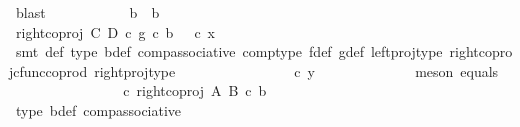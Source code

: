 \begin{isabellebody}
\ blast\isanewline
\ \ \ \ \ \ \ \ \isamarkupfalse%
\ \isamarkupfalse%
\ {\isachardoublequoteopen}b\ {\isacharequal}{\kern0pt}\ b{\isacharprime}{\kern0pt}{\isachardoublequoteclose}\isanewline
\ \ \ \ \ \ \ \ \isamarkupfalse%
\ {\isacharminus}{\kern0pt}\ \isanewline
\ \ \ \ \ \ \ \ \ \ \isamarkupfalse%
\ {\isachardoublequoteopen}{\isacharparenleft}{\kern0pt}right{\isacharunderscore}{\kern0pt}coproj\ C\ D\ {\isasymcirc}\isactrlsub c\ g{\isacharparenright}{\kern0pt}\ {\isasymcirc}\isactrlsub c\ b\ {\isacharequal}{\kern0pt}\ {\isasymphi}\ {\isasymcirc}\isactrlsub c\ x{\isachardoublequoteclose}\isanewline
\ \ \ \ \ \ \ \ \ \ \ \ \isamarkupfalse%
\ {\isacharparenleft}{\kern0pt}smt\ {\isasymphi}{\isacharunderscore}{\kern0pt}def\ {\isasymphi}{\isacharunderscore}{\kern0pt}type\ b{\isacharunderscore}{\kern0pt}def\ comp{\isacharunderscore}{\kern0pt}associative{}\ comp{\isacharunderscore}{\kern0pt}type\ f{\isacharunderscore}{\kern0pt}def{\isacharparenleft}{\kern0pt}{}{\isacharparenright}{\kern0pt}\ g{\isacharunderscore}{\kern0pt}def{\isacharparenleft}{\kern0pt}{}{\isacharparenright}{\kern0pt}\ left{\isacharunderscore}{\kern0pt}proj{\isacharunderscore}{\kern0pt}type\ right{\isacharunderscore}{\kern0pt}coproj{\isacharunderscore}{\kern0pt}cfunc{\isacharunderscore}{\kern0pt}coprod\ right{\isacharunderscore}{\kern0pt}proj{\isacharunderscore}{\kern0pt}type{\isacharparenright}{\kern0pt}\isanewline
\ \ \ \ \ \ \ \ \ \ \isamarkupfalse%
\ \isamarkupfalse%
\ {\isachardoublequoteopen}{\isachardot}{\kern0pt}{\isachardot}{\kern0pt}{\isachardot}{\kern0pt}\ {\isacharequal}{\kern0pt}\ {\isasymphi}\ {\isasymcirc}\isactrlsub c\ y{\isachardoublequoteclose}\isanewline
\ \ \ \ \ \ \ \ \ \ \ \ \isamarkupfalse%
\ {\isacharparenleft}{\kern0pt}meson\ equals{\isacharparenright}{\kern0pt}\isanewline
\ \ \ \ \ \ \ \ \ \ \isamarkupfalse%
\ \isamarkupfalse%
\ {\isachardoublequoteopen}{\isachardot}{\kern0pt}{\isachardot}{\kern0pt}{\isachardot}{\kern0pt}\ {\isacharequal}{\kern0pt}\ {\isacharparenleft}{\kern0pt}{\isasymphi}\ {\isasymcirc}\isactrlsub c\ right{\isacharunderscore}{\kern0pt}coproj\ A\ B{\isacharparenright}{\kern0pt}\ {\isasymcirc}\isactrlsub c\ b{\isacharprime}{\kern0pt}{\isachardoublequoteclose}\isanewline
\ \ \ \ \ \ \ \ \ \ \ \ \isamarkupfalse%
\ {\isasymphi}{\isacharunderscore}{\kern0pt}type\ b{\isacharprime}{\kern0pt}{\isacharunderscore}{\kern0pt}def\ comp{\isacharunderscore}{\kern0pt}associative{}\ \isamarkupfalse%

\end{isabellebody}
